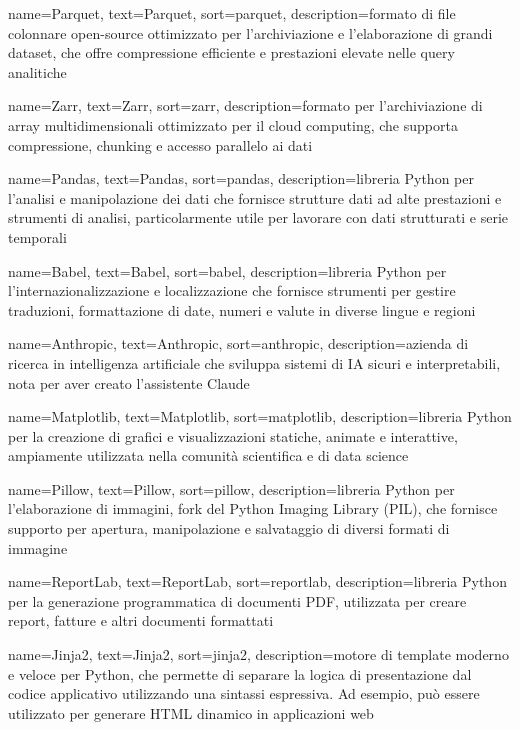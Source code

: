  {
    name=Parquet,
    text=Parquet,
    sort=parquet,
    description={formato di file colonnare open-source ottimizzato per l'archiviazione e l'elaborazione di grandi dataset, che offre compressione efficiente e prestazioni elevate nelle query analitiche}
}

 {
    name=Zarr,
    text=Zarr,
    sort=zarr,
    description={formato per l'archiviazione di array multidimensionali ottimizzato per il cloud computing, che supporta compressione, chunking e accesso parallelo ai dati}
}

 {
    name=Pandas,
    text=Pandas,
    sort=pandas,
    description={libreria Python per l'analisi e manipolazione dei dati che fornisce strutture dati ad alte prestazioni e strumenti di analisi, particolarmente utile per lavorare con dati strutturati e serie temporali}
}

 {
    name=Babel,
        text=Babel,
        sort=babel,
        description={libreria Python per l'internazionalizzazione e localizzazione che fornisce strumenti per gestire traduzioni, formattazione di date, numeri e valute in diverse lingue e regioni}
}

 {
    name=Anthropic,
    text=Anthropic,
    sort=anthropic,
    description={azienda di ricerca in intelligenza artificiale che sviluppa sistemi di IA sicuri e interpretabili, nota per aver creato l'assistente Claude}
}

 {
    name=Matplotlib,
    text=Matplotlib,
    sort=matplotlib,
    description={libreria Python per la creazione di grafici e visualizzazioni statiche, animate e interattive, ampiamente utilizzata nella comunità scientifica e di data science}
}

 {
    name=Pillow,
    text=Pillow,
    sort=pillow,
    description={libreria Python per l'elaborazione di immagini, fork del Python Imaging Library (PIL), che fornisce supporto per apertura, manipolazione e salvataggio di diversi formati di immagine}
}

 {
    name=ReportLab,
    text=ReportLab,
    sort=reportlab,
    description={libreria Python per la generazione programmatica di documenti PDF, utilizzata per creare report, fatture e altri documenti formattati}
}

 {
    name=Jinja2,
    text=Jinja2,
    sort=jinja2,
    description={motore di template moderno e veloce per Python, che permette di separare la logica di presentazione dal codice applicativo utilizzando una sintassi espressiva. Ad esempio, può essere utilizzato per generare HTML dinamico in applicazioni web}
}

